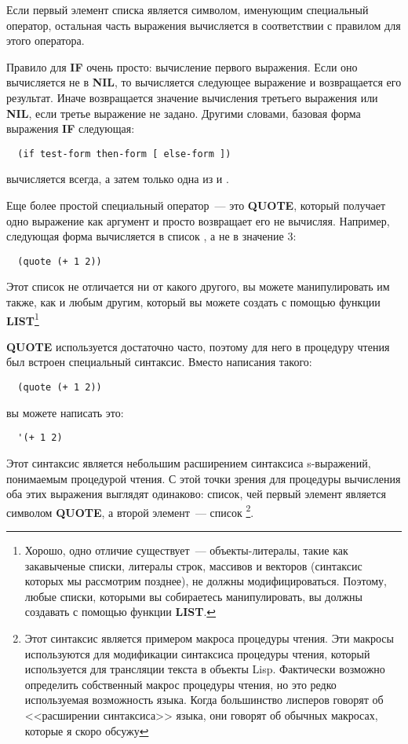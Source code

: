 Если первый элемент списка является символом, именующим специальный оператор, остальная
часть выражения вычисляется в соответствии с правилом для этого оператора.

Правило для \textbf{IF} очень просто: вычисление первого выражения. Если оно вычисляется
не в \textbf{NIL}, то вычисляется следующее выражение и возвращается его результат. Иначе
возвращается значение вычисления третьего выражения или \textbf{NIL}, если третье
выражение не задано. Другими словами, базовая форма выражения \textbf{IF} следующая:

\begin{lstlisting}
  (if test-form then-form [ else-form ])
\end{lstlisting}

 вычисляется всегда, а затем только одна из  и
.

Еще более простой специальный оператор~--- это \textbf{QUOTE}, который получает одно
выражение как аргумент и просто возвращает его не вычисляя. Например, следующая форма
вычисляется в список , а не в значение 3:

\begin{lstlisting}
  (quote (+ 1 2))
\end{lstlisting}

Этот список не отличается ни от какого другого, вы можете манипулировать им также, как и
любым другим, который вы можете создать с помощью функции \textbf{LIST}\footnote{Хорошо,
  одно отличие существует~--- объекты-литералы, такие как закавыченые списки, литералы
  строк, массивов и векторов (синтаксис которых мы рассмотрим позднее), не должны
  модифицироваться. Поэтому, любые списки, которыми вы собираетесь манипулировать, вы
  должны создавать с помощью функции \textbf{LIST}.}

\textbf{QUOTE} используется достаточно часто, поэтому для него в процедуру чтения был
встроен специальный синтаксис. Вместо написания такого:

\begin{lstlisting}
  (quote (+ 1 2))
\end{lstlisting}

вы можете написать это:

\begin{lstlisting}
  '(+ 1 2)
\end{lstlisting}

Этот синтаксис является небольшим расширением синтаксиса s-выражений, понимаемым
процедурой чтения. С этой точки зрения для процедуры вычисления оба этих выражения
выглядят одинаково: список, чей первый элемент является символом \textbf{QUOTE}, а второй
элемент~--- список \footnote{Этот синтаксис является примером макроса
  процедуры чтения. Эти макросы используются для модификации синтаксиса процедуры чтения,
  который используется для трансляции текста в объекты Lisp. Фактически возможно
  определить собственный макрос процедуры чтения, но это редко используемая возможность
  языка. Когда большинство лисперов говорят об <<расширении синтаксиса>> языка, они говорят
  об обычных макросах, которые я скоро обсужу}.

